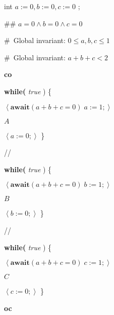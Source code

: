 \documentclass[muchmore,11pt]{article}%
\begin{document}
\begin{code}
int $a:=0,b:=0,c:=0$ ;

\#\# $a=0\wedge b=0\wedge c=0$

\#\ Global invariant: $0\leq a,b,c\leq1$

\#\ Global invariant: $a+b+c<2$

\textbf{co}

\begin{indent}


\item \textbf{while(} \textit{true} ) \{

\begin{indent}
\item $\left\langle \mathbf{await}(a+b+c=0)\;a:=1;\right\rangle $

\item $A$

\item $\left\langle a:=0;\right\rangle $ \}
\end{indent}
\end{indent}

//

\begin{indent}
\item \textbf{while(} \textit{true} ) \{

\begin{indent}
\item $\left\langle \mathbf{await}(a+b+c=0)\;b:=1;\right\rangle $

\item $B$

\item $\left\langle b:=0;\right\rangle $ \}
\end{indent}
\end{indent}

//

\begin{indent}
\item \textbf{while(} \textit{true} ) \{

\begin{indent}
\item $\left\langle \mathbf{await}(a+b+c=0)\;c:=1;\right\rangle $

\item $C$

\item $\left\langle c:=0;\right\rangle $ \}
\end{indent}
\end{indent}

\textbf{oc}
\end{code}
\end{document}
